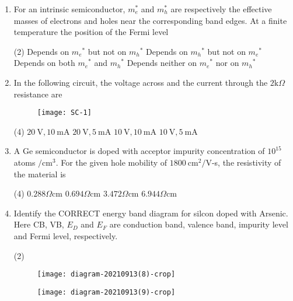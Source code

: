 \begin{enumerate}
	\item For an intrinsic semiconductor, $m_{e}^{*}$ and $m_{h}^{*}$ are respectively the effective masses of electrons and holes near the corresponding band edges. At a finite temperature the position of the Fermi level
{	}
\begin{tasks}(2)
\task[\textbf{A.}] Depends on $m_{e}{ }^{*}$ but not on $m_{h}{ }^{*}$
\task[\textbf{B.}] Depends on $m_{h}{ }^{*}$ but not on $m_{e}{ }^{*}$
\task[\textbf{C.}] Depends on both $m_{e}{ }^{*}$ and $m_{h}{ }^{*}$
\task[\textbf{D.}] Depends neither on $m_{e}{ }^{*}$ nor on $m_{h}{ }^{*}$
\end{tasks}
	\item In the following circuit, the voltage across and the current through the $2 \mathrm{k} \Omega$ resistance are
{	}
\begin{figure}[H]
\centering
\texttt{[image: SC-1]}
\end{figure}
\begin{tasks}(4)
\task[\textbf{A.}] $20 \mathrm{~V}, 10 \mathrm{~mA}$
\task[\textbf{B.}] $20 \mathrm{~V}, 5 \mathrm{~mA}$
\task[\textbf{C.}] $10 \mathrm{~V}, 10 \mathrm{~mA}$
\task[\textbf{D.}] $10 \mathrm{~V}, 5 \mathrm{~mA}$
\end{tasks}
	\item A Ge semiconductor is doped with acceptor impurity concentration of $10^{15}$ atoms $/ \mathrm{cm}^{3}$. For the given hole mobility of $1800 \mathrm{~cm}^{2} / \mathrm{V}$-s, the resistivity of the material is
{	}
\begin{tasks}(4)
\task[\textbf{A.}] $0.288 \Omega \mathrm{cm}$
\task[\textbf{B.}] $0.694 \Omega \mathrm{cm}$
\task[\textbf{C.}] $3.472 \Omega \mathrm{cm}$
\task[\textbf{D.}] $6.944 \Omega \mathrm{cm}$
\end{tasks}
	\item Identify the CORRECT energy band diagram for silcon doped with Arsenic. Here CB, VB, $E_{D}$ and $E_{F}$ are conduction band, valence band, impurity level and Fermi level, respectively.
{	}
\begin{tasks}(2)
\task[\textbf{A.}] \begin{figure}[H]
	\centering
	\texttt{[image: diagram-20210913(8)-crop]}
\end{figure}
\task[\textbf{B.}] \begin{figure}[H]
	\centering
	\texttt{[image: diagram-20210913(9)-crop]}

\end{figure}
\end{tasks}
\end{enumerate}
